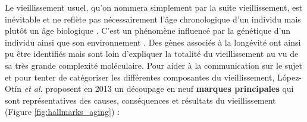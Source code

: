 Le vieillissement usuel, qu'on nommera simplement par la suite vieillissement, est inévitable et ne reflète pas nécessairement l'âge chronologique d'un individu mais plutôt un âge biologique \cite{Horvath2013Oct}. C'est un phénomène influencé par la génétique d'un individu \cite{Khan2017Aug, deMagalhaes2003Mar} ainsi que son environnement \cite{Jones2015Dec}. Des gènes associés à la longévité ont ainsi pu être identifiés mais sont loin d'expliquer la totalité du vieillissement au vu de sa très grande complexité moléculaire. Pour aider à la communication sur le sujet et pour tenter de catégoriser les différentes composantes du vieillissement, López-Otín \textit{et al.} proposent en 2013 un découpage en neuf \textbf{marques principales} qui sont représentatives des causes, conséquences et résultats du vieillissement (Figure \ref{fig:hallmarks_aging}) \cite{Lopez-Otin2013} : 
